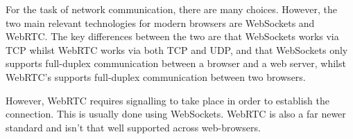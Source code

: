 \documentclass[class=article, crop=false]{standalone}
\begin{document}
		For the task of network communication, there are many choices. However, the two main relevant technologies for modern browsers are WebSockets and WebRTC. The key differences between the two are that WebSockets works via TCP whilst WebRTC works via both TCP and UDP, and that WebSockets only supports full-duplex communication between a browser and a web server, whilst WebRTC's supports full-duplex communication between two browsers. 

		However, WebRTC requires signalling to take place in order to establish the connection. This is usually done using WebSockets. WebRTC is also a far newer standard and isn't that well supported across web-browsers.
\end{document}
